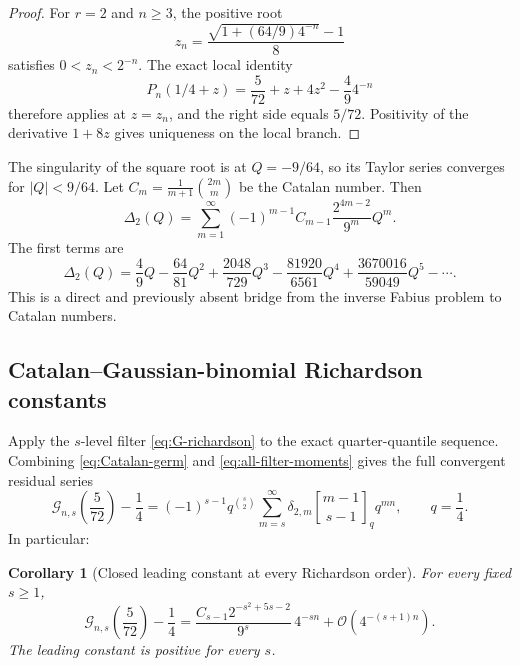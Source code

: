 \documentclass[11pt,oneside]{article}
\numberwithin{equation}{section}
\newtheorem{corollary}[theorem]{Corollary}
\theoremstyle{definition}
\theoremstyle{remark}
\newcommand{\bigO}{\mathcal O}
\newcommand{\qbinom}[3]{\genfrac{[}{]}{0pt}{}{#1}{#2}_{#3}}
\begin{document}
\begin{proof}
For $r=2$ and $n\ge3$, the positive root
\[
 z_n=\frac{\sqrt{1+(64/9)4^{-n}}-1}{8}
\]
satisfies $0<z_n<2^{-n}$.  The exact local identity
\[
 P_n(1/4+z)=\frac5{72}+z+4z^2-\frac49 4^{-n}
\]
therefore applies at $z=z_n$, and the right side equals $5/72$.  Positivity of
the derivative $1+8z$ gives uniqueness on the local branch.
\end{proof}

The singularity of the square root is at $Q=-9/64$, so its Taylor series converges
for $|Q|<9/64$.  Let $C_m=\frac1{m+1}\binom{2m}{m}$ be the Catalan number.
Then
\begin{equation}
 \boxed{
 \Delta_2(Q)=\sum_{m=1}^{\infty}
 (-1)^{m-1}C_{m-1}\frac{2^{4m-2}}{9^m}Q^m.}
 \label{eq:Catalan-germ}
\end{equation}
The first terms are
\begin{equation}
 \Delta_2(Q)=\frac49Q-\frac{64}{81}Q^2
 +\frac{2048}{729}Q^3-\frac{81920}{6561}Q^4
 +\frac{3670016}{59049}Q^5-\cdots.
 \label{eq:Catalan-first}
\end{equation}
This is a direct and previously absent bridge from the inverse Fabius problem to Catalan
numbers.

\subsection{Catalan--Gaussian-binomial Richardson constants}

Apply the $s$-level filter \eqref{eq:G-richardson} to the exact quarter-quantile
sequence.  Combining \eqref{eq:Catalan-germ} and
\eqref{eq:all-filter-moments} gives the full convergent residual series
\begin{equation}
 \boxed{
 \mathcal G_{n,s}\!\left(\frac5{72}\right)-\frac14
 =(-1)^{s-1}q^{\binom s2}
 \sum_{m=s}^{\infty}
 \delta_{2,m}\qbinom{m-1}{s-1}{q}q^{mn},
 \qquad q=\frac14.}
 \label{eq:Catalan-qbinom-full}
\end{equation}
In particular:

\begin{corollary}[Closed leading constant at every Richardson order]
\label{cor:Catalan-Richardson}
For every fixed $s\ge1$,
\begin{equation}
 \boxed{
 \mathcal G_{n,s}\!\left(\frac5{72}\right)-\frac14
 =\frac{C_{s-1}2^{-s^2+5s-2}}{9^s}\,4^{-sn}
 +\bigO(4^{-(s+1)n}).}
 \label{eq:Catalan-Richardson}
\end{equation}
The leading constant is positive for every $s$.
\end{corollary}
\end{document}
